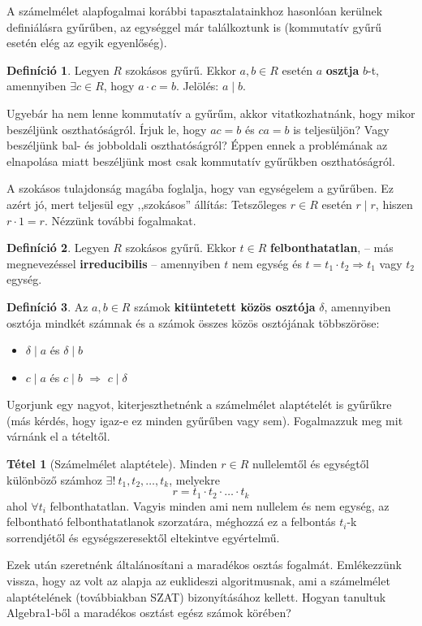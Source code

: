 \documentclass[12pt]{book}
\theoremstyle{plain} %
\theoremstyle{definition} %
\newtheorem{defi/}{Definíció}[section]
\newenvironment{defi}
  {\renewcommand{\qedsymbol}{$\clubsuit$}%
   \pushQED{\qed}\begin{defi/}}
  {\popQED\end{defi/}}
\newtheorem{theo/}{Tétel}[section]
\newenvironment{theo}
  {\renewcommand{\qedsymbol}{$\clubsuit$}%
   \pushQED{\qed}\begin{theo/}}
  {\popQED\end{theo/}}
\theoremstyle{remark}
\renewcommand\qedsymbol{$\blacksquare$}
\numberwithin{equation}{section}  %
\begin{document}
	A számelmélet alapfogalmai korábbi tapasztalatainkhoz hasonlóan kerülnek definiálásra gyűrűben, az egységgel már találkoztunk is (kommutatív gyűrű esetén elég az egyik egyenlőség).
	\begin{defi}
		Legyen $R$ szokásos gyűrű. Ekkor $a,b\in R$ esetén $a$ \textbf{osztja} $b$-t, amennyiben $\exists c\in R$, hogy $a\cdot c = b$. Jelölés: $a \mid b$.
	\end{defi}
	Ugyebár ha nem lenne kommutatív a gyűrűm, akkor vitatkozhatnánk, hogy mikor beszéljünk oszthatóságról. Írjuk le, hogy $ac=b$ és $ca=b$ is teljesüljön? Vagy beszéljünk bal- és jobboldali oszthatóságról? Éppen ennek a problémának az elnapolása miatt beszéljünk most csak kommutatív gyűrűkben oszthatóságról.
	
	A szokásos tulajdonság magába foglalja, hogy van egységelem a gyűrűben. Ez azért jó, mert teljesül egy ,,szokásos'' állítás: Tetszőleges $r\in R$ esetén $r \mid r$, hiszen $r\cdot 1 = r$. Nézzünk további fogalmakat.
	\begin{defi}
		Legyen $R$ szokásos gyűrű. Ekkor $t\in R$ \textbf{felbonthatatlan}, -- más megnevezéssel \textbf{irreducibilis} -- amennyiben $t$ nem egység és $t=t_1\cdot t_2 \Rightarrow t_1$ vagy $t_2$ egység.
	\end{defi}
	\begin{defi}
	Az $a,b\in R$ számok \textbf{kitüntetett közös osztója} $\delta$, amennyiben osztója mindkét számnak és a számok összes közös osztójának többszöröse:
		\begin{itemize}
			\item $\delta \mid a$ és $\delta \mid b$
			\item $c\mid a$ és $c\mid b$ $\Rightarrow$ $c \mid \delta$
		\end{itemize}
	\end{defi}
	Ugorjunk egy nagyot, kiterjeszthetnénk a számelmélet alaptételét is gyűrűkre (más kérdés, hogy igaz-e ez minden gyűrűben vagy sem). Fogalmazzuk meg mit várnánk el a tételtől.
	\begin{theo}[Számelmélet alaptétele]\label{szat}
		Minden $r\in R$ nullelemtől és egységtől különböző számhoz $\exists!\ t_1, t_2, \ldots, t_k$, melyekre
		\[ r = t_1\cdot t_2 \cdot \ldots \cdot t_k \]
		ahol $\forall t_i$ felbonthatatlan. Vagyis minden ami nem nullelem és nem egység, az felbontható felbonthatatlanok szorzatára, méghozzá ez a felbontás $t_i$-k sorrendjétől és egységszeresektől eltekintve egyértelmű.
	\end{theo}
	Ezek után szeretnénk általánosítani a maradékos osztás fogalmát. Emlékezzünk vissza, hogy az volt az alapja az euklideszi algoritmusnak, ami a számelmélet alaptételének (továbbiakban SZAT) bizonyításához kellett. Hogyan tanultuk Algebra1-ből a maradékos osztást egész számok körében?
\end{document}
